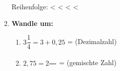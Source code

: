 \begin{enumerate}[label=\arabic*.]
    Reihenfolge: \underline{\hspace{1.5cm}} < \underline{\hspace{1.5cm}} < \underline{\hspace{1.5cm}} < \underline{\hspace{1.5cm}} < \underline{\hspace{1.5cm}}

    \vspace{0.5cm}

    \item \textbf{Wandle um:}
    \begin{enumerate}[label=\alph*)]
        \item $3\dfrac{1}{4} = 3 + 0,25$ = \underline{\hspace{3cm}} (Dezimalzahl)
        \item $2,75 = 2\dfrac{\phantom{00}}{\phantom{00}}$ = \underline{\hspace{3cm}} (gemischte Zahl)
    \end{enumerate}
\end{enumerate}
